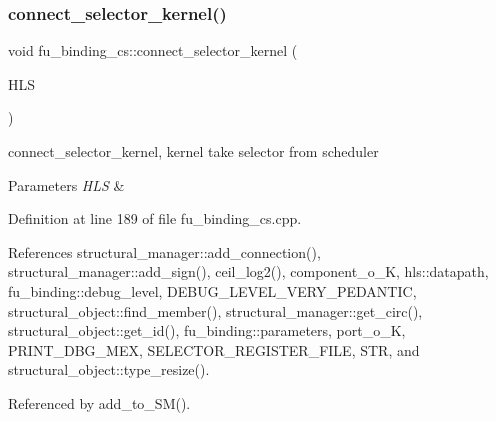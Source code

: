 \subsubsection{\texorpdfstring{connect\+\_\+selector\+\_\+kernel()}{connect\_selector\_kernel()}}
{\footnotesize\ttfamily void fu\+\_\+binding\+\_\+cs\+::connect\+\_\+selector\+\_\+kernel (\begin{DoxyParamCaption}\item[{const \hyperlink{hls_8hpp_a75d0c73923d0ddfa28c4843a802c73a7}{hls\+Ref}}]{H\+LS }\end{DoxyParamCaption})\hspace{0.3cm}{\ttfamily [protected]}}



connect\+\_\+selector\+\_\+kernel, kernel take selector from scheduler 


\begin{DoxyParams}{Parameters}
{\em H\+LS} & \\
\hline
\end{DoxyParams}


Definition at line 189 of file fu\+\_\+binding\+\_\+cs.\+cpp.



References structural\+\_\+manager\+::add\+\_\+connection(), structural\+\_\+manager\+::add\+\_\+sign(), ceil\+\_\+log2(), component\+\_\+o\+\_\+K, hls\+::datapath, fu\+\_\+binding\+::debug\+\_\+level, D\+E\+B\+U\+G\+\_\+\+L\+E\+V\+E\+L\+\_\+\+V\+E\+R\+Y\+\_\+\+P\+E\+D\+A\+N\+T\+IC, structural\+\_\+object\+::find\+\_\+member(), structural\+\_\+manager\+::get\+\_\+circ(), structural\+\_\+object\+::get\+\_\+id(), fu\+\_\+binding\+::parameters, port\+\_\+o\+\_\+K, P\+R\+I\+N\+T\+\_\+\+D\+B\+G\+\_\+\+M\+EX, S\+E\+L\+E\+C\+T\+O\+R\+\_\+\+R\+E\+G\+I\+S\+T\+E\+R\+\_\+\+F\+I\+LE, S\+TR, and structural\+\_\+object\+::type\+\_\+resize().



Referenced by add\+\_\+to\+\_\+\+S\+M().

